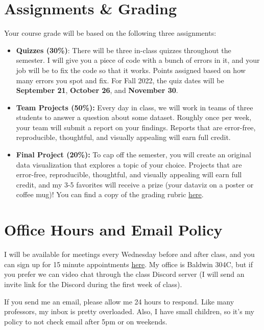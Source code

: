\documentclass[11pt, letterpaper]{article}
\begin{document}
\section*{Assignments \& Grading}

Your course grade will be based on the following three assignments:

\begin{itemize}
	\item \textbf{Quizzes (30\%)}: There will be three in-class quizzes throughout the semester. I will give you a piece of code with a bunch of errors in it, and your job will be to fix the code so that it works. Points assigned based on how many errors you spot and fix. For Fall 2022, the quiz dates will be \textbf{September 21}, \textbf{October 26}, and \textbf{November 30}.
	\item \textbf{Team Projects (50\%):} Every day in class, we will work in teams of three students to answer a question about some dataset. Roughly once per week, your team will submit a report on your findings. Reports that are error-free, reproducible, thoughtful, and visually appealing will earn full credit.
	\item \textbf{Final Project (20\%):} To cap off the semester, you will create an original data visualization that explores a topic of your choice. Projects that are error-free, reproducible, thoughtful, and visually appealing will earn full credit, and my 3-5 favorites will receive a prize (your dataviz on a poster or coffee mug)! You can find a copy of the grading rubric \href{https://joeornstein.github.io/pols-3230/syllabus/POLS-3230-final-rubric.xlsx}{here}.
\end{itemize}

\section*{Office Hours and Email Policy}
I will be available for meetings every Wednesday before and after class, and you can sign up for 15 minute appointments \href{https://calendly.com/jornstein/15min}{here}. My office is Baldwin 304C, but if you prefer we can video chat through the class Discord server (I will send an invite link for the Discord during the first week of class).

If you send me an email, please allow me 24 hours to respond. Like many professors, my inbox is pretty overloaded. Also, I have small children, so it's my policy to not check email after 5pm or on weekends. 
\end{document}
